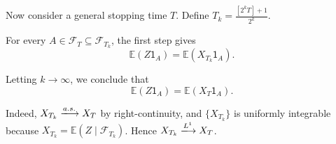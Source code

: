 {    Now consider a general stopping time $T$. Define $T_k = \frac{[2^k T] + 1}{2^k}$.

    For every $A \in \mathcal{F}_T \subseteq \mathcal{F}_{T _k}$, the first step gives
    $$
        \mathbb{E}(Z \mathsf{1}_A) = \mathbb{E}(X_{T_k} \mathsf{1}_A).
    $$

    Letting $k \to \infty$, we conclude that
    $$
        \mathbb{E}(Z \mathsf{1}_A) = \mathbb{E}(X_T \mathsf{1}_A).
    $$

    Indeed, $X_{T_k} \xlongrightarrow{a.s.} X_T$ by right-continuity, and $\{X_{T_k}\}$ is uniformly integrable because $X_{T_k} = \mathbb{E}(Z \mid \mathcal{F}_{T_k})$. Hence $X_{T_k} \xlongrightarrow{L^1}X_T$.
}


